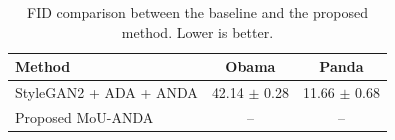 \begin{table}[t]
\centering
\caption{FID comparison between the baseline and the proposed method. Lower is better.}
\label{tab:method_comparison}
\begin{tabular}{lcc}
\hline
Method & Obama & Panda \\
\hline
StyleGAN2 + ADA + ANDA & 42.14 $\pm$ 0.28 & 11.66 $\pm$ 0.68 \\
Proposed MoU-ANDA & -- & -- \\
\hline
\end{tabular}
\end{table}
